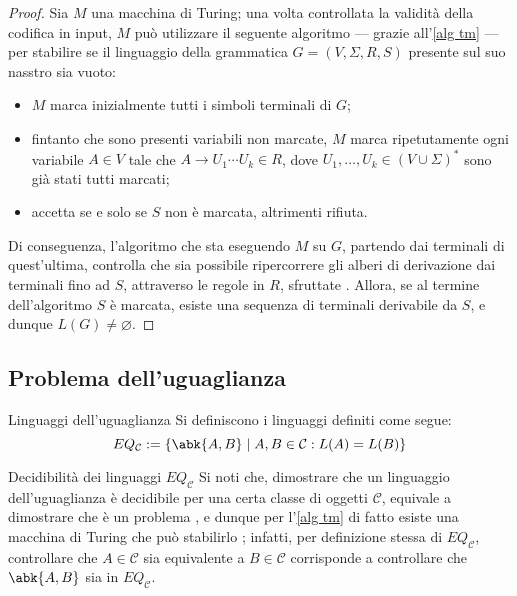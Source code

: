 \documentclass[a4paper, 12pt]{report}
\begin{document}
    \begin{proof}
        Sia $M$ una macchina di Turing; una volta controllata la validità della codifica in input, $M$ può utilizzare il seguente algoritmo --- grazie all'\cref{alg tm} --- per stabilire se il linguaggio della grammatica $G = (V, \Sigma, R, S)$ presente sul suo nasstro sia vuoto:

        \begin{itemize}
            \item $M$ marca inizialmente tutti i simboli terminali di $G$;
            \item fintanto che sono presenti variabili non marcate, $M$ marca ripetutamente ogni variabile $A \in V$ tale che $A \to U_1 \cdots U_k \in R$, dove $U_1, \ldots, U_k \in (V \cup \Sigma)^*$ sono già stati tutti marcati;
            \item accetta se e solo se $S$ non è marcata, altrimenti rifiuta.
        \end{itemize}

        Di conseguenza, l'algoritmo che sta eseguendo $M$ su $G$, partendo dai terminali di quest'ultima, controlla che sia possibile ripercorrere gli alberi di derivazione dai terminali fino ad $S$, attraverso le regole in $R$, sfruttate . Allora, se al termine dell'algoritmo $S$ è marcata, esiste una sequenza di terminali derivabile da $S$, e dunque $L(G) \neq \varnothing$.
    \end{proof}

    \subsection{Problema dell'uguaglianza}

    \begin{frameddefn}{Linguaggi dell'uguaglianza}
        Si definiscono  i linguaggi definiti come segue: $$EQ_\mathcal{C} := \{\abk{A, B} \mid A, B \in \mathcal{C} : L(A) = L(B)\}$$
    \end{frameddefn}

    \begin{framedobs}{Decidibilità dei linguaggi $EQ_\mathcal C$}
        Si noti che, dimostrare che un linguaggio dell'uguaglianza è decidibile per una certa classe di oggetti $\mathcal{C}$, equivale a dimostrare che  è un problema , e dunque per l'\cref{alg tm} di fatto esiste una macchina di Turing che può stabilirlo ; infatti, per definizione stessa di $EQ_\mathcal C$, controllare che $A \in \mathcal{C}$ sia equivalente a $B \in \mathcal C$ corrisponde a controllare che $\abk{A,B}$ sia in $EQ_\mathcal{C}$.
    \end{framedobs}
\end{document}
